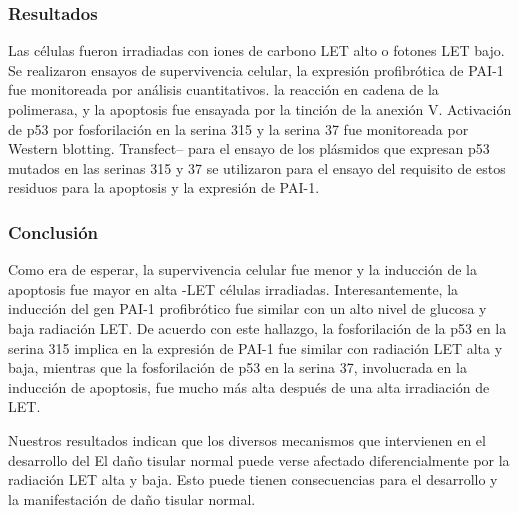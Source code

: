 \documentclass{beamer}
\begin{document}

\begin{frame}
	\frametitle{Resultados}
	Las células fueron irradiadas con iones de carbono LET alto o fotones LET bajo.
	Se realizaron ensayos de supervivencia celular, la expresión profibrótica de PAI-1 fue monitoreada por análisis cuantitativos.
	la reacción en cadena de la polimerasa, y la apoptosis fue ensayada por la tinción de la anexión V. Activación de p53
	por fosforilación en la serina 315 y la serina 37 fue monitoreada por Western blotting. Transfect--
	para el ensayo de los plásmidos que expresan p53 mutados en las serinas 315 y 37 se utilizaron para el ensayo del requisito
	de estos residuos para la apoptosis y la expresión de PAI-1.
	
\end{frame}



\begin{frame}
	\frametitle{Conclusión}
	Como era de esperar, la supervivencia celular fue menor y la inducción de la apoptosis fue mayor en alta -LET
	células irradiadas. Interesantemente, la inducción del gen PAI-1 profibrótico fue similar con un alto nivel de glucosa y
	baja radiación LET. De acuerdo con este hallazgo, la fosforilación de la p53 en la serina 315 implica
	en la expresión de PAI-1 fue similar con radiación LET alta y baja, mientras que la fosforilación de
	p53 en la serina 37, involucrada en la inducción de apoptosis, fue mucho más alta después de una alta irradiación de LET.
	
\end{frame}



\begin{frame}
	Nuestros resultados indican que los diversos mecanismos que intervienen en el desarrollo del
	El daño tisular normal puede verse afectado diferencialmente por la radiación LET alta y baja. Esto puede
	tienen consecuencias para el desarrollo y la manifestación de daño tisular normal.
\end{frame}
\end{document}
